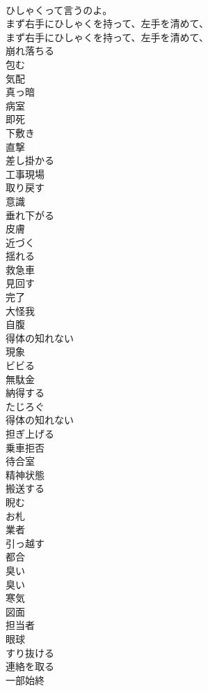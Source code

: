 \documentclass[8pt]{extreport}
\begin{document}
\begin{CJK}{UTF8}{min}
\\	ひしゃくって言うのよ。 
\\	まず右手にひしゃくを持って、左手を清めて、	
\\	まず右手にひしゃくを持って、左手を清めて、 
\\	崩れ落ちる
\\	包む
\\	気配
\\	真っ暗
\\	病室
\\	即死
\\	下敷き
\\	直撃
\\	差し掛かる
\\	工事現場
\\	取り戻す
\\	意識
\\	垂れ下がる
\\	皮膚
\\	近づく
\\	揺れる
\\	救急車
\\	見回す
\\	完了
\\	大怪我
\\	自腹
\\	得体の知れない
\\	現象
\\	ビビる
\\	無駄金
\\	納得する
\\	たじろぐ
\\	得体の知れない
\\	担ぎ上げる
\\	乗車拒否
\\	待合室
\\	精神状態
\\	搬送する
\\	睨む
\\	お札
\\	業者
\\	引っ越す
\\	都合
\\	臭い
\\	臭い
\\	寒気
\\	図面
\\	担当者
\\	眼球
\\	すり抜ける
\\	連絡を取る
\\	一部始終

\end{CJK}
\end{document}
